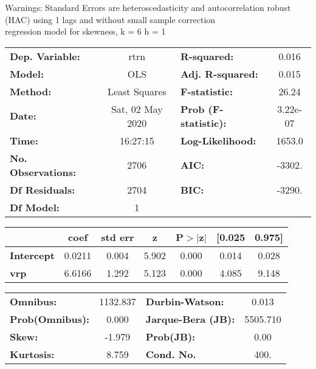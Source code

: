 Warnings: \newline
 [1] Standard Errors are heteroscedasticity and autocorrelation robust (HAC) using 1 lags and without small sample correction\\ 

regression model for skewness, k = 6 h = 1\begin{center}
\begin{tabular}{lclc}
\toprule
\textbf{Dep. Variable:}    &       rtrn       & \textbf{  R-squared:         } &     0.016   \\
\textbf{Model:}            &       OLS        & \textbf{  Adj. R-squared:    } &     0.015   \\
\textbf{Method:}           &  Least Squares   & \textbf{  F-statistic:       } &     26.24   \\
\textbf{Date:}             & Sat, 02 May 2020 & \textbf{  Prob (F-statistic):} &  3.22e-07   \\
\textbf{Time:}             &     16:27:15     & \textbf{  Log-Likelihood:    } &    1653.0   \\
\textbf{No. Observations:} &        2706      & \textbf{  AIC:               } &    -3302.   \\
\textbf{Df Residuals:}     &        2704      & \textbf{  BIC:               } &    -3290.   \\
\textbf{Df Model:}         &           1      & \textbf{                     } &             \\
\bottomrule
\end{tabular}
\begin{tabular}{lcccccc}
                   & \textbf{coef} & \textbf{std err} & \textbf{z} & \textbf{P$> |$z$|$} & \textbf{[0.025} & \textbf{0.975]}  \\
\midrule
\textbf{Intercept} &       0.0211  &        0.004     &     5.902  &         0.000        &        0.014    &        0.028     \\
\textbf{vrp}       &       6.6166  &        1.292     &     5.123  &         0.000        &        4.085    &        9.148     \\
\bottomrule
\end{tabular}
\begin{tabular}{lclc}
\textbf{Omnibus:}       & 1132.837 & \textbf{  Durbin-Watson:     } &    0.013  \\
\textbf{Prob(Omnibus):} &   0.000  & \textbf{  Jarque-Bera (JB):  } & 5505.710  \\
\textbf{Skew:}          &  -1.979  & \textbf{  Prob(JB):          } &     0.00  \\
\textbf{Kurtosis:}      &   8.759  & \textbf{  Cond. No.          } &     400.  \\
\bottomrule
\end{tabular}
\end{center}


